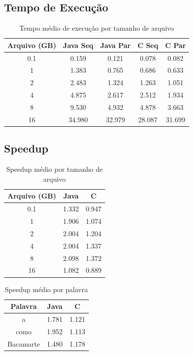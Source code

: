 \documentclass[10pt,twocolumn,a4paper]{article}
\begin{document}
\subsection{Tempo de Execução}

\begin{table}[H]
\centering
\caption{Tempo médio de execução por tamanho de arquivo}
\begin{tabular}{ccccc}
\toprule
Arquivo (GB) & Java Seq & Java Par & C Seq & C Par \\
\midrule
0.1 & 0.159 & 0.121 & 0.078 & 0.082 \\
1 & 1.383 & 0.765 & 0.686 & 0.633 \\
2 & 2.483 & 1.324 & 1.263 & 1.051 \\
4 & 4.875 & 2.617 & 2.512 & 1.934 \\
8 & 9.530 & 4.932 & 4.878 & 3.663 \\
16 & 34.980 & 32.979 & 28.087 & 31.699 \\
\bottomrule
\end{tabular}
\end{table}

\subsection{Speedup}

\begin{table}[H]
\centering
\caption{Speedup médio por tamanho de arquivo}
\begin{tabular}{ccc}
\toprule
Arquivo (GB) & Java & C \\
\midrule
0.1 & 1.332 & 0.947 \\
1 & 1.906 & 1.074 \\
2 & 2.004 & 1.204 \\
4 & 2.004 & 1.337 \\
8 & 2.098 & 1.372 \\
16 & 1.082 & 0.889 \\
\bottomrule
\end{tabular}
\end{table}

\begin{table}[H]
\centering
\caption{Speedup médio por palavra}
\begin{tabular}{ccc}
\toprule
Palavra & Java & C \\
\midrule
a & 1.781 & 1.121 \\
como & 1.952 & 1.113 \\
Bacamarte & 1.480 & 1.178 \\
\bottomrule
\end{tabular}
\end{table}
\end{document}
